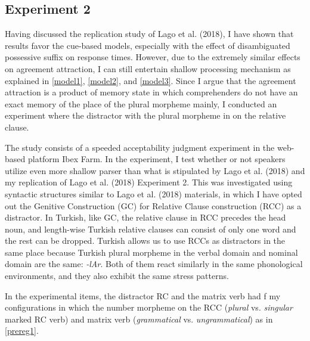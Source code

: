 \documentclass[english,doc]{apa6}
\begin{document}
\hypertarget{experiment-2}{%
\subsection{Experiment 2}\label{experiment-2}}

Having discussed the replication study of Lago et al. (2018), I have shown that results favor the cue-based models, especially with the effect of disambiguated possessive suffix on response times. However, due to the extremely similar effects on agreement attraction, I can still entertain shallow processing mechanism as explained in \autoref{model1}, \autoref{model2}, and \autoref{model3}. Since I argue that the agreement attraction is a product of memory state in which comprehenders do not have an exact memory of the place of the plural morpheme mainly, I conducted an experiment where the distractor with the plural morpheme in on the relative clause.

The study consists of a speeded acceptability judgment experiment in the web-based platform Ibex Farm. In the experiment, I test whether or not speakers utilize even more shallow parser than what is stipulated by Lago et al. (2018) and my replication of Lago et al. (2018) Experiment 2. This was investigated using syntactic structures similar to Lago et al. (2018) materials, in which I have opted out the Genitive Construction (GC) for Relative Clause construction (RCC) as a distractor. In Turkish, like GC, the relative clause in RCC precedes the head noun, and length-wise Turkish relative clauses can consist of only one word and the rest can be dropped. Turkish allows us to use RCCs as distractors in the same place because Turkish plural morpheme in the verbal domain and nominal domain are the same: \emph{-lAr}. Both of them react similarly in the same phonological environments, and they also exhibit the same stress patterns.

In the experimental items, the distractor RC and the matrix verb had f my configurations in which the number morpheme on the RCC (\emph{plural} vs. \emph{singular} marked RC verb) and matrix verb (\emph{grammatical} vs. \emph{ungrammatical}) as in \autoref{prereg1}.
\end{document}
